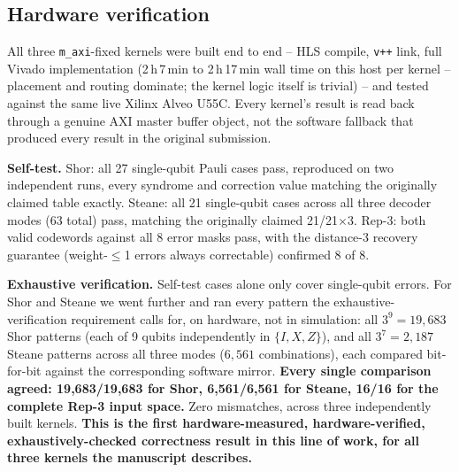 \subsection{Hardware verification}\label{subsec:res-hardware}

All three \texttt{m\_axi}-fixed kernels were built end to end -- HLS compile, \texttt{v++} link, full Vivado implementation (2\,h\,7\,min to 2\,h\,17\,min wall time on this host per kernel -- placement and routing dominate; the kernel logic itself is trivial) -- and tested against the same live Xilinx Alveo U55C. Every kernel's result is read back through a genuine AXI master buffer object, not the software fallback that produced every result in the original submission.

\textbf{Self-test.} Shor: all 27 single-qubit Pauli cases pass, reproduced on two independent runs, every syndrome and correction value matching the originally claimed table exactly. Steane: all 21 single-qubit cases across all three decoder modes (63 total) pass, matching the originally claimed 21/21$\times$3. Rep-3: both valid codewords against all 8 error masks pass, with the distance-3 recovery guarantee (weight-$\le$1 errors always correctable) confirmed 8 of 8.

\textbf{Exhaustive verification.} Self-test cases alone only cover single-qubit errors. For Shor and Steane we went further and ran every pattern the exhaustive-verification requirement calls for, on hardware, not in simulation: all $3^9=19{,}683$ Shor patterns (each of 9 qubits independently in $\{I,X,Z\}$), and all $3^7=2{,}187$ Steane patterns across all three modes ($6{,}561$ combinations), each compared bit-for-bit against the corresponding software mirror. \textbf{Every single comparison agreed: 19,683/19,683 for Shor, 6,561/6,561 for Steane, 16/16 for the complete Rep-3 input space.} Zero mismatches, across three independently built kernels. \textbf{This is the first hardware-measured, hardware-verified, exhaustively-checked correctness result in this line of work, for all three kernels the manuscript describes.}



